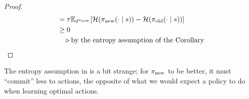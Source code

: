 \documentclass[\main/thesis.tex]{subfiles}
\begin{document}
\begin{proof}
\begin{align*}
    &= \tau \mathbb{E}_{d^{\pi_\mathrm{new}}}[ \mathcal{H} ({\pi_\mathrm{new}}(\cdot \mid s)) - \mathcal{H}({\pi_\mathrm{old}}(\cdot \mid s))]\\
    &\geq 0\\
    &\quad \triangleright \text{by the entropy assumption of the Corollary}
\end{align*}
\end{proof}
\noindent The entropy assumption in  is a bit strange; for ${\pi_\mathrm{new}}$ to be better, it must ``commit'' less to actions, the opposite of what we would expect a policy to do when learning optimal actions. 
\end{document}
